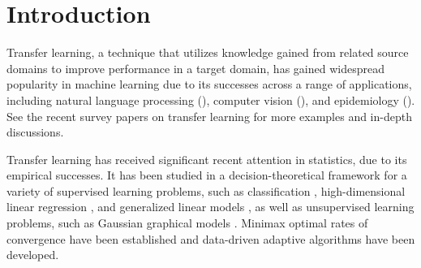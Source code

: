 \documentclass{article}
\begin{document}








\section{Introduction}

Transfer learning, a technique that utilizes knowledge gained from related source domains to improve performance in a target domain, has gained widespread popularity in machine learning due to its successes across a range of applications, including natural language processing (\citealp{daume2009frustratingly}), computer vision (\citealp{tzeng2017adversarial}), and epidemiology (\citealp{apostolopoulos2020covid}). See the recent survey papers on transfer learning \citep{weiss2016survey,zhuang2020comprehensive} for more examples and in-depth discussions.

Transfer learning has received significant recent attention in statistics, due to its empirical successes. It has been studied in a decision-theoretical framework for a variety of supervised learning problems, such as classification \citep{cai2021transfer, reeve2021adaptive}, high-dimensional linear regression \citep{li2020transfer}, and generalized linear models  \citep{Li2021Transfer-GLM}, as well as unsupervised learning problems, such as Gaussian graphical models \citep{Li2020Transfer-GMM}. Minimax optimal rates of convergence have been established and data-driven adaptive algorithms have been developed. %

 
 
\end{document}
